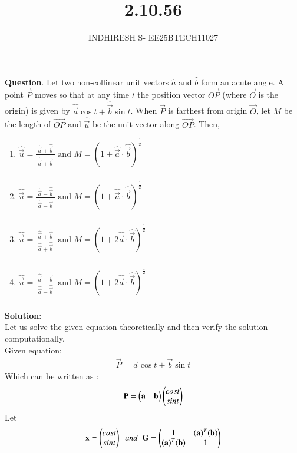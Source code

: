 \documentclass[journal]{IEEEtran}
\theoremstyle{remark}
\begin{document}

\onecolumn

\title{2.10.56}
\author{INDHIRESH S- EE25BTECH11027}
\maketitle


\renewcommand{\thefigure}{\theenumi}
\renewcommand{\thetable}{\theenumi}

\textbf{Question}.  Let two non-collinear unit vectors $\hat{a}$ and $\hat{b}$ form an acute angle. A point $\vec{P}$ moves so that at any time $t$ the position vector $\overrightarrow{OP}$ (where $\vec{O}$ is the origin) is given by $\hat{\vec{a}}\cos{t} + \hat{\vec{b}}\sin{t}$. When $\vec{P}$ is farthest from origin $\vec{O}$, let $M$ be the length of $\overrightarrow{OP}$ and $\hat{\vec{u}}$ be the unit vector along $\overrightarrow{OP}$. Then,
\begin{multicols}{2} 
    \begin{enumerate}
	    \item $\hat{\vec{u}} = \frac{\hat{\vec{a}}+\hat{\vec{b}}}{|\hat{\vec{a}}+\hat{\vec{b}}|} \text{ and } M = (1+\hat{\vec{a}} \cdot \hat{\vec{b}})^{\frac{1}{2}}$
    	\item $\hat{\vec{u}} = \frac{\hat{\vec{a}}-\hat{\vec{b}}}{|\hat{\vec{a}}-\hat{\vec{b}}|} \text{ and } M = (1+\hat{\vec{a}} \cdot \hat{\vec{b}})^{\frac{1}{2}}$
    	\item $\hat{\vec{u}} = \frac{\hat{\vec{a}}+\hat{\vec{b}}}{|\hat{\vec{a}}+\hat{\vec{b}}|} \text{ and } M = (1+2\hat{\vec{a}} \cdot \hat{\vec{b}})^{\frac{1}{2}}$
    	\item $\hat{\vec{u}} = \frac{\hat{\vec{a}}-\hat{\vec{b}}}{|\hat{\vec{a}}-\hat{\vec{b}}|} \text{ and } M = (1+2\hat{\vec{a}} \cdot \hat{\vec{b}})^{\frac{1}{2}}$
    \end{enumerate}
    \end{multicols}
\textbf{Solution}:\\
Let us solve the given equation theoretically and then verify the solution computationally. \\
Given equation:
\begin{align}
     \Vec{P}=\vec{a}\cos{t} + \vec{b}\sin{t}
\end{align}
Which can be written as :
\begin{align}
    \Vec{P}=\myvec{\vec{a}&\vec{b}}\myvec{cost\\sint}
\end{align}
Let
\begin{align}
    \Vec{x}= \myvec{cost \\ sint} \;\;and\;\;\vec{G}=\myvec{1&(\Vec{a})^T(\Vec{b})\\(\Vec{a})^T(\Vec{b})&1}
\end{align}
\end{document}
